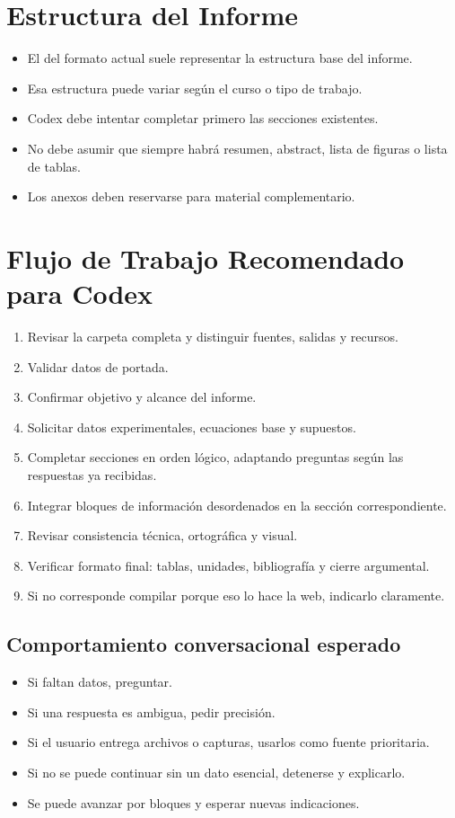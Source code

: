 \documentclass[12pt,a4paper]{article}
\begin{document}
\section{Estructura del Informe}
\begin{itemize}
  \item El \indice del formato actual suele representar la estructura base del informe.
  \item Esa estructura puede variar seg\'un el curso o tipo de trabajo.
  \item Codex debe intentar completar primero las secciones existentes.
  \item No debe asumir que siempre habr\'a resumen, abstract, lista de figuras o lista de tablas.
  \item Los anexos deben reservarse para material complementario.
\end{itemize}

\section{Flujo de Trabajo Recomendado para Codex}
\begin{enumerate}
  \item Revisar la carpeta completa y distinguir fuentes, salidas y recursos.
  \item Validar datos de portada.
  \item Confirmar objetivo y alcance del informe.
  \item Solicitar datos experimentales, ecuaciones base y supuestos.
  \item Completar secciones en orden l\'ogico, adaptando preguntas seg\'un las respuestas ya recibidas.
  \item Integrar bloques de informaci\'on desordenados en la secci\'on correspondiente.
  \item Revisar consistencia t\'ecnica, ortogr\'afica y visual.
  \item Verificar formato final: tablas, unidades, bibliograf\'ia y cierre argumental.
  \item Si no corresponde compilar porque eso lo hace la web, indicarlo claramente.
\end{enumerate}

\subsection{Comportamiento conversacional esperado}
\begin{itemize}
  \item Si faltan datos, preguntar.
  \item Si una respuesta es ambigua, pedir precisi\'on.
  \item Si el usuario entrega archivos o capturas, usarlos como fuente prioritaria.
  \item Si no se puede continuar sin un dato esencial, detenerse y explicarlo.
  \item Se puede avanzar por bloques y esperar nuevas indicaciones.
\end{itemize}
\end{document}
